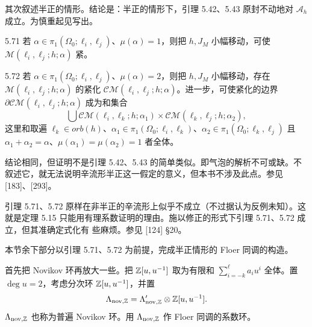 
其次叙述半正的情形。结论是：半正的情形下，引理 5.42、5.43 原封不动地对 $\mathcal{A}_h$ 成立。为慎重起见写出。

\begin{lemma}{5.71}
  若 $\alpha\in\pi_1(\Omega_0;\ell_i,\ell_j)$、$\mu(\alpha)=1$，则把 $h,J_M$ 小幅移动，可使 $\mathcal{M}(\ell_i,\ell_j;h;\alpha)$ 紧。
\end{lemma}

\begin{lemma}{5.72}
  若 $\alpha\in\pi_1(\Omega_0;\ell_i,\ell_j)$、$\mu(\alpha)=2$，则把 $h,J_M$ 小幅移动，存在 $\mathcal{M}(\ell_i,\ell_j;h;\alpha)$ 的紧化 $\mathcal{CM}(\ell_i,\ell_j;h;\alpha)$。进一步，可使紧化的边界 $\partial\mathcal{CM}(\ell_i,\ell_j;h;\alpha)$ 成为和集合
  \[
    \bigcup\mathcal{CM}(\ell_i,\ell_k;h;\alpha_1)\times\mathcal{CM}(\ell_k,\ell_j;h;\alpha_2),
  \]
  这里和取遍 $\ell_k\in orb(h)$、$\alpha_1\in\pi_1(\Omega_0;\ell_i,\ell_k)$、$\alpha_2\in\pi_1(\Omega_0;\ell_k,\ell_j)$ 且 $\alpha_1+\alpha_2=\alpha$、$\mu(\alpha_1)=\mu(\alpha_2)=1$ 者全体。
\end{lemma}

结论相同，但证明不是引理 5.42、5.43 的简单类似。即气泡的解析不可或缺。不叙述它，就无法说明辛流形半正这一假定的意义，但本书不涉及此点。参见 [183]、[293]。

引理 5.71、5.72 原样在非半正的辛流形上似乎不成立（不过据认为反例未知）。这就是定理 5.15 只能用有理系数证明的理由。施以修正的形式下引理 5.71、5.72 成立，但其准确定式化有
些麻烦。参见 [124] §20。

本节余下部分以引理 5.71、5.72 为前提，完成半正情形的 Floer 同调的构造。

首先把 Novikov 环再放大一些。把 $\mathbb{Z}[u,u^{-1}]$ 取为有限和 $\sum_{i=-k}^{\ell}a_iu^i$ 全体。置 $\deg u=2$，考虑分次环 $\mathbb{Z}[u,u^{-1}]$，并置
\[
  \Lambda_{\mathrm{nov},\mathbb{Z}}=\Lambda'_{\mathrm{nov},\mathbb{Z}}\otimes\mathbb{Z}[u,u^{-1}].
\]
$\Lambda_{\mathrm{nov},\mathbb{Z}}$ 也称为普遍 Novikov 环。用 $\Lambda_{\mathrm{nov},\mathbb{Z}}$ 作 Floer 同调的系数环。


